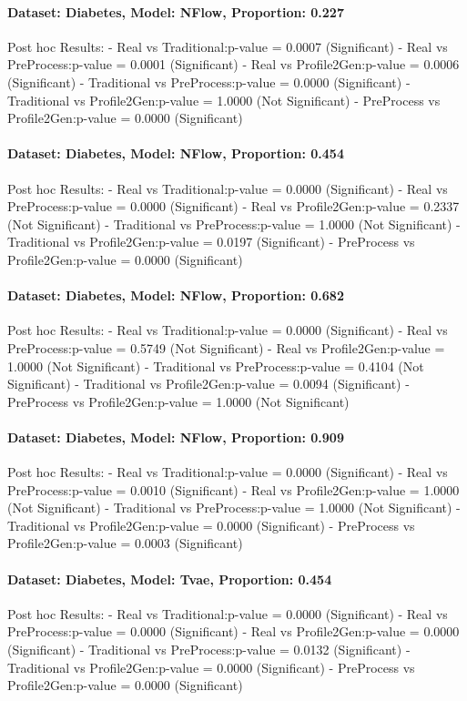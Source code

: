 \documentclass{article}
\theoremstyle{plain}
\theoremstyle{definition}
\theoremstyle{remark}
\begin{document}
\paragraph{Dataset: Diabetes, Model: NFlow, Proportion: 0.227
}Post hoc Results:
- Real vs Traditional:p-value = 0.0007 (Significant)
- Real vs PreProcess:p-value = 0.0001 (Significant)
- Real vs Profile2Gen:p-value = 0.0006 (Significant)
- Traditional vs PreProcess:p-value = 0.0000 (Significant)
- Traditional vs Profile2Gen:p-value = 1.0000 (Not Significant)
- PreProcess vs Profile2Gen:p-value = 0.0000 (Significant)

\paragraph{Dataset: Diabetes, Model: NFlow, Proportion: 0.454
}Post hoc Results:
- Real vs Traditional:p-value = 0.0000 (Significant)
- Real vs PreProcess:p-value = 0.0000 (Significant)
- Real vs Profile2Gen:p-value = 0.2337 (Not Significant)
- Traditional vs PreProcess:p-value = 1.0000 (Not Significant)
- Traditional vs Profile2Gen:p-value = 0.0197 (Significant)
- PreProcess vs Profile2Gen:p-value = 0.0000 (Significant)

\paragraph{Dataset: Diabetes, Model: NFlow, Proportion: 0.682
}Post hoc Results:
- Real vs Traditional:p-value = 0.0000 (Significant)
- Real vs PreProcess:p-value = 0.5749 (Not Significant)
- Real vs Profile2Gen:p-value = 1.0000 (Not Significant)
- Traditional vs PreProcess:p-value = 0.4104 (Not Significant)
- Traditional vs Profile2Gen:p-value = 0.0094 (Significant)
- PreProcess vs Profile2Gen:p-value = 1.0000 (Not Significant)

\paragraph{Dataset: Diabetes, Model: NFlow, Proportion: 0.909
}Post hoc Results:
- Real vs Traditional:p-value = 0.0000 (Significant)
- Real vs PreProcess:p-value = 0.0010 (Significant)
- Real vs Profile2Gen:p-value = 1.0000 (Not Significant)
- Traditional vs PreProcess:p-value = 1.0000 (Not Significant)
- Traditional vs Profile2Gen:p-value = 0.0000 (Significant)
- PreProcess vs Profile2Gen:p-value = 0.0003 (Significant)

\paragraph{Dataset: Diabetes, Model: Tvae, Proportion: 0.454
}Post hoc Results:
- Real vs Traditional:p-value = 0.0000 (Significant)
- Real vs PreProcess:p-value = 0.0000 (Significant)
- Real vs Profile2Gen:p-value = 0.0000 (Significant)
- Traditional vs PreProcess:p-value = 0.0132 (Significant)
- Traditional vs Profile2Gen:p-value = 0.0000 (Significant)
- PreProcess vs Profile2Gen:p-value = 0.0000 (Significant)
\end{document}
